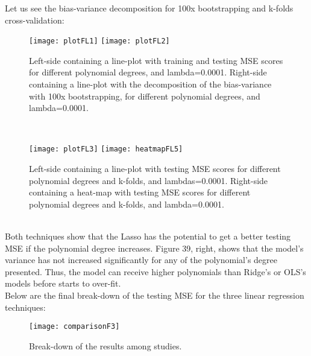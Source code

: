 Let us see the bias-variance decomposition for 100x bootstrapping and k-folds cross-validation:\\

\begin{figure}[H]
\label{fig:plotFL1and2}
\centering
\texttt{[image: plotFL1]}
\texttt{[image: plotFL2]}
\caption{Left-side containing a line-plot with training and testing MSE scores for different polynomial degrees, and lambda=0.0001. Right-side containing a line-plot with the decomposition of the bias-variance with 100x bootstrapping, for different polynomial degrees, and lambda=0.0001.}
\end{figure}\\

\begin{figure}[H]
\label{fig:plotFL3andH5}
\centering
\texttt{[image: plotFL3]}
\texttt{[image: heatmapFL5]}
\caption{Left-side containing a line-plot with testing MSE scores for different polynomial degrees and k-folds, and lambdas=0.0001. Right-side containing a heat-map with testing MSE scores for different polynomial degrees and k-folds, and lambda=0.0001.}
\end{figure}\\

Both techniques show that the Lasso has the potential to get a better testing MSE if the polynomial degree increases. Figure 39, right, shows that the model's variance has not increased significantly for any of the polynomial's degree presented. Thus, the model can receive higher polynomials than Ridge's or OLS's models before starts to over-fit.\\

Below are the final break-down of the testing MSE for the three linear regression techniques:\\

\begin{figure}[H]
\label{fig:comparisonF3}
\centering
\texttt{[image: comparisonF3]}
\caption{Break-down of the results among studies.}
\end{figure}\\
